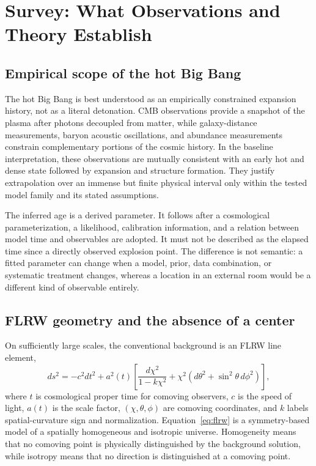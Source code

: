 \documentclass[10pt,conference]{IEEEtran}
\begin{document}
\section{Survey: What Observations and Theory Establish}
\label{sec:survey}

\subsection{Empirical scope of the hot Big Bang}

The hot Big Bang is best understood as an empirically constrained expansion history, not as a literal detonation. CMB observations provide a snapshot of the plasma after photons decoupled from matter, while galaxy-distance measurements, baryon acoustic oscillations, and abundance measurements constrain complementary portions of the cosmic history. In the baseline interpretation, these observations are mutually consistent with an early hot and dense state followed by expansion and structure formation. They justify extrapolation over an immense but finite physical interval only within the tested model family and its stated assumptions.

The inferred age is a derived parameter. It follows after a cosmological parameterization, a likelihood, calibration information, and a relation between model time and observables are adopted. It must not be described as the elapsed time since a directly observed explosion point. The difference is not semantic: a fitted parameter can change when a model, prior, data combination, or systematic treatment changes, whereas a location in an external room would be a different kind of observable entirely.

\subsection{FLRW geometry and the absence of a center}

On sufficiently large scales, the conventional background is an FLRW line element,
\begin{equation}
ds^2=-c^2dt^2+a^2(t)\left[\frac{d\chi^2}{1-k\chi^2}+\chi^2\left(d\theta^2+\sin^2\theta\,d\phi^2\right)\right],
\label{eq:flrw}
\end{equation}
where $t$ is cosmological proper time for comoving observers, $c$ is the speed of light, $a(t)$ is the scale factor, $(\chi,\theta,\phi)$ are comoving coordinates, and $k$ labels spatial-curvature sign and normalization. Equation~\eqref{eq:flrw} is a symmetry-based model of a spatially homogeneous and isotropic universe. Homogeneity means that no comoving point is physically distinguished by the background solution, while isotropy means that no direction is distinguished at a comoving point.
\end{document}
